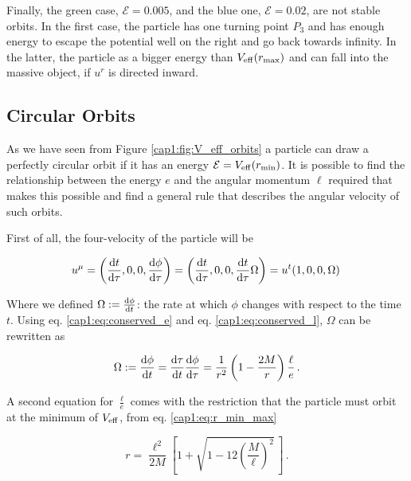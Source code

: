 Finally, the green case, $\mathcal E = 0.005$, and the blue one,
$\mathcal E = 0.02$, are not stable orbits.
In the first case, the particle has one turning point $P_3$ and has enough
energy to escape the potential well on the right and go back towards infinity.
In the latter, the particle as a bigger energy than $V_{\rm eff} (r_{\rm max})$
and can fall into the massive object, if $u^r$ is directed inward.


\subsection{Circular Orbits}
\label{cap1:ssec:circular_orbits}

As we have seen from Figure \ref{cap1:fig:V_eff_orbits} a particle can draw a
perfectly circular orbit if it has an energy $\mathcal E = V_{\rm eff}(r_{\rm min})$.
It is possible to find the relationship between the energy $e$
and the angular momentum $\ell$ required that makes this possible and find a
general rule that describes the angular velocity of such orbits.

First of all, the four-velocity of the particle will be

\begin{equation}
    u^\mu = \left(\dv{t}{\tau}, 0, 0, \dv{\phi}{\tau} \right)
    = \left(\dv{t}{\tau}, 0, 0, \dv{t}{\tau} \Omega \right)
    = u^t (1, 0, 0, \Omega) \,
    \label{cap1:eq:circular_orbit_u}
\end{equation}

Where we defined $\Omega := \dv{\phi}{t}$: the rate at which $\phi$ changes with
respect to the \Sh time $t$.
Using eq. \ref{cap1:eq:conserved_e} and eq. \ref{cap1:eq:conserved_l}, $\Omega$
can be rewritten as

\begin{equation}
    \Omega := \dv{\phi}{t} = \dv{\tau}{t} \dv{\phi}{\tau} =
    \frac{1}{r^2} \left(1 - \frac{2M}{r} \right) \frac{\ell}{e}\, .
    \label{cap1:eq:Omega}
\end{equation}

A second equation for $\frac{\ell}{e}$ comes with the restriction that the
particle must orbit at the minimum of $V_{\rm eff}$, from eq.
\ref{cap1:eq:r_min_max}

\begin{equation}
    r = \frac{\ell^2}{2 M} \left[1 +
    \sqrt{1 - 12 \left( \frac{M}{\ell} \right)^2} \, \right] \, .
    \label{cap1:eq:r_min}
\end{equation}

